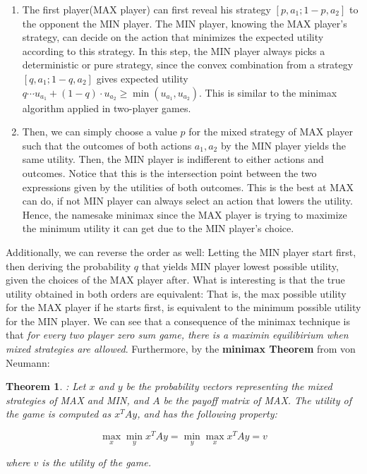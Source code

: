 \documentclass[11pt]{article}
\newtheorem{theorem}{Theorem}
\begin{document}
\begin{enumerate}
    \item The first player(MAX player) can first reveal his strategy $[p, a_1; 1-p, a_2]$ to the opponent the MIN player. The MIN player, knowing the MAX player's strategy, can decide on the action that minimizes the expected utility according to this strategy. In this step, the MIN player always picks a deterministic or pure strategy, since the convex combination from a strategy $[q, a_1; 1-q, a_2]$ gives expected utility $q\cdots u_{a_1} + (1-q)\cdot u_{a_2} \geq \min(u_{a_1}, u_{a_2})$. This is similar to the minimax algorithm applied in two-player games.\\
    
    \item Then, we can simply choose a value $p$ for the mixed strategy of MAX player such that the outcomes of both actions $a_1, a_2$ by the MIN player yields the same utility. Then, the MIN player is indifferent to either actions and outcomes. Notice that this is the intersection point between the two expressions given by the utilities of both outcomes. This is the best at MAX can do, if not MIN player can always select an action that lowers the utility. Hence, the namesake minimax since the MAX player is trying to maximize the minimum utility it can get due to the MIN player's choice.\\
\end{enumerate}

Additionally, we can reverse the order as well: Letting the MIN player start first, then deriving the probability $q$ that yields MIN player lowest possible utility, given the choices of the MAX player after. What is interesting is that the true utility obtained in both orders are equivalent: That is, the max possible utility for the MAX player if he starts first, is equivalent to the minimum possible utility for the MIN player. We can see that a consequence of the minimax technique is that \textit{for every two player zero sum game, there is a maximin equilibirium when mixed strategies are allowed}. Furthermore, by the \textbf{minimax Theorem} from von Neumann:

\begin{theorem}
: Let $x$ and $y$ be the probability vectors representing the mixed strategies of MAX and MIN, and $A$ be the payoff matrix of MAX. The utility of the game is computed as $x^TAy$, and has the following property:

$$
\max_x \min_y x^TAy = \min_y \max_x x^TAy = v
$$

where $v$ is the utility of the game.
\end{theorem}
\end{document}
